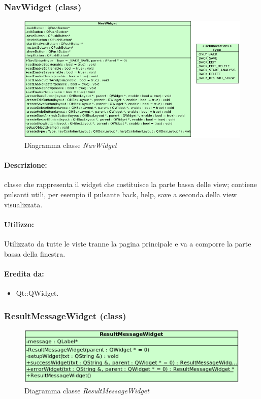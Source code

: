 	\subsubsection{NavWidget (class)}
	\begin{figure}[!h]
		\centering
		\includegraphics[scale=2.75]{./Content/Immagini/view/NavWidget}
		\caption{Diagramma classe \textsl{NavWidget}}
	\end{figure}
	\paragraph{Descrizione:} classe che rappresenta il widget che costituisce la parte bassa delle view; contiene pulsanti utili, per esempio il pulsante back, help, save a seconda della view visualizzata.
	\paragraph{Utilizzo:} Utilizzato da tutte le viste tranne la pagina principale e va a comporre la parte bassa della finestra.
	\paragraph{Eredita da:}
		\begin{itemize}
			\item Qt::QWidget.
		\end{itemize}
	\subsubsection{ResultMessageWidget (class)}
	\begin{figure}[!h]
		\centering
		\includegraphics[scale=2.75]{./Content/Immagini/view/ResultMessageWidget}
		\caption{Diagramma classe \textsl{ResultMessageWidget}}
	\end{figure}
